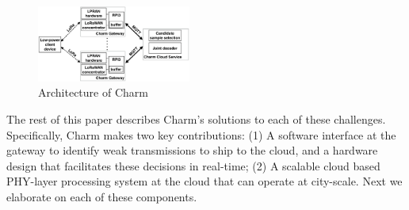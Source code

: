 \begin{figure}[!htb]
    \centering
    \includegraphics[width=0.45\textwidth]{figures/charm-architecture_cropped.pdf}
    \caption{Architecture of Charm}
    \label{fig:architecture}
    \compactimg
\end{figure}

The rest of this paper describes Charm's solutions to each of these
challenges. Specifically, Charm makes two key contributions: (1) A software
interface at the gateway to identify weak transmissions to ship to the cloud,
and a hardware design that facilitates these decisions in real-time; (2) A
scalable cloud based PHY-layer processing system at the cloud that can operate
at city-scale. Next we elaborate on each of these components.
